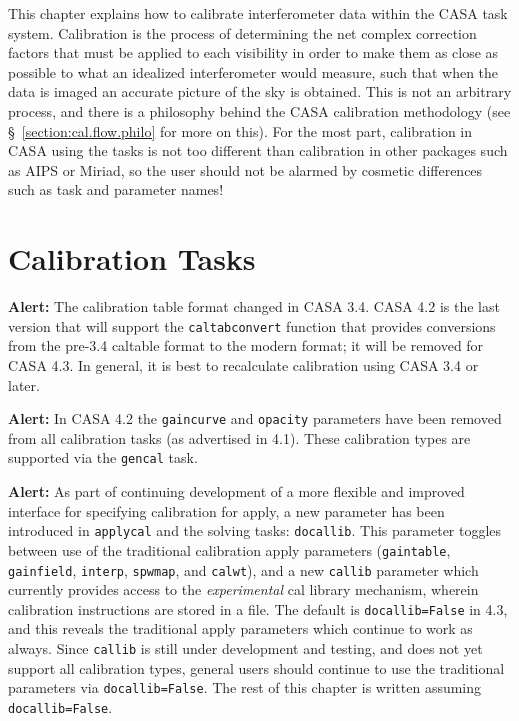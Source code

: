 This chapter explains how to calibrate interferometer
data within the CASA task system.  Calibration is the process
of determining the net complex correction factors that must be 
applied to each visibility in order to make them as close as
possible to what an idealized interferometer would measure, such
that when the data is imaged an accurate picture of the sky
is obtained.  This is not an arbitrary process, and there is
a philosophy behind the CASA calibration methodology (see
\S~\ref{section:cal.flow.philo} for more on this).  For the most part,
calibration in CASA using the tasks is not too different than
calibration in other packages such as AIPS or Miriad, so the user
should not be alarmed by cosmetic differences such as task and
parameter names!

\section{Calibration Tasks}
\label{section:cal.tasks}

{\bf Alert:} The calibration table format changed in CASA
3.4.   CASA 4.2 is the last version that will support the 
{\tt caltabconvert} function that provides conversions from
the pre-3.4 caltable format to the modern format; it will be
removed for CASA 4.3.  In general, it is best to recalculate
calibration using CASA 3.4 or later.

{\bf Alert:} In CASA 4.2 the {\tt gaincurve} and {\tt opacity} 
parameters have been removed from all calibration tasks (as advertised
in 4.1).  These calibration types are supported via the 
{\tt gencal} task.

{\bf Alert:} As part of continuing development of a more flexible and
improved interface for specifying calibration for apply, a new
parameter has been introduced in {\tt applycal} and the solving
tasks: {\tt docallib}.   This parameter toggles between use of the
traditional calibration apply parameters ({\tt gaintable}, 
{\tt gainfield}, {\tt interp}, {\tt spwmap}, and {\tt calwt}),
and a new {\tt callib} parameter which currently provides 
access to the {\em experimental} cal library mechanism, wherein
calibration instructions are stored in a file. 
The default is {\tt docallib=False} in 4.3, and this reveals the 
traditional apply parameters which continue to work as always. 
Since {\tt callib} is still under development and testing, and 
does not yet support all calibration types, general users should 
continue to use the traditional parameters via {\tt docallib=False}.  The
rest of this chapter is written assuming {\tt docallib=False}.


